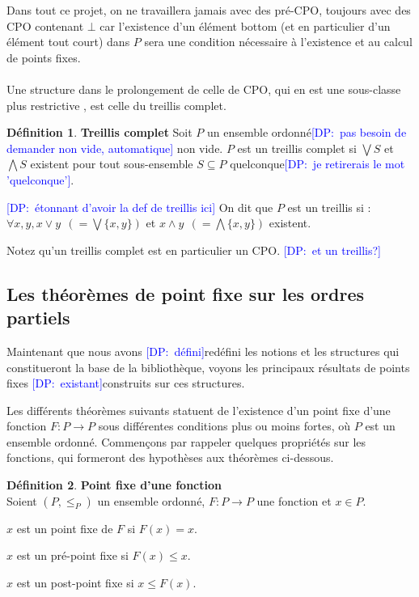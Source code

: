 \documentclass{article}
\newcommand{\yz}[1]{\textcolor{blue}{{[YZ:~#1]}}}
\newcommand\dam[1]{\textcolor{blue}{{[DP:~#1]}}}
\theoremstyle{definition}
\newtheorem{definition}{Définition}[section]
\begin{document}
Dans tout ce projet, on ne travaillera jamais avec des pré-CPO, toujours avec des CPO contenant $\bot$ car l'existence d'un élément bottom (et en particulier d'un élément tout court) dans $P$ sera une condition nécessaire à l'existence et au calcul de points fixes.

\paragraph{}

Une structure dans le prolongement de celle de CPO, qui en est une sous-classe plus restrictive %
, est celle du treillis complet.

\begin{definition}{\textbf{Treillis complet}}
  Soit $P$ un ensemble ordonné\dam{pas besoin de demander non vide, automatique} non vide. $P$ est un treillis complet si $\bigvee S$ et $\bigwedge S$ existent pour tout sous-ensemble $S \subseteq P$ quelconque\dam{je retirerais le mot 'quelconque'}.

\dam{étonnant d'avoir la def de treillis ici}
On dit que $P$ est un treillis si : ~ $\forall x, y, x \vee y ~~ (= \bigvee \{x,y\})$ et $x \wedge y ~~ (= \bigwedge \{x,y\})$ existent.
\end{definition}
Notez qu'un treillis complet est en particulier un CPO.
\dam{et un treillis?}

\subsection{Les théorèmes de point fixe sur les ordres partiels}

Maintenant que nous avons \dam{défini}redéfini les notions et les structures qui constitueront la base de la bibliothèque, voyons les principaux résultats de points fixes \dam{existant}construits sur ces structures.

Les différents théorèmes suivants statuent de l'existence d'un point fixe d'une fonction $F : P \rightarrow P$ sous différentes conditions plus ou moins fortes, où $P$ est un ensemble ordonné. Commençons par rappeler quelques propriétés sur les fonctions, qui formeront des hypothèses aux théorèmes ci-dessous.

\begin{definition}{\textbf{Point fixe d'une fonction\\}}
\label{fixpoint-def}
Soient $(P, \leq_P)$ un ensemble ordonné, $F : P \rightarrow P$ une fonction et $x \in P$. 

$x$ est un point fixe de $F$ si $F(x) = x$.

$x$ est un pré-point fixe si $F(x) \leq x$.

$x$ est un post-point fixe si $x \leq F(x)$.
\end{definition}
\end{document}
